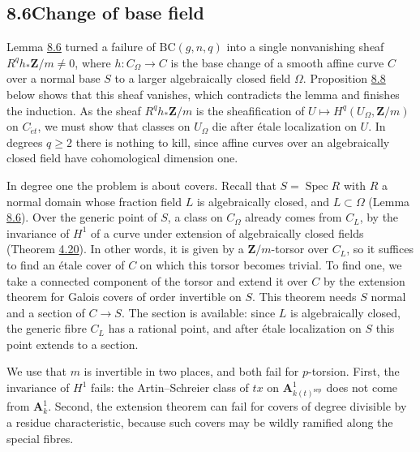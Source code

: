 \documentclass[11pt]{article}
\begin{document}
\subsection*{\texorpdfstring{8.6\quad Change of base field}{8.6 Change of base field}}
\label{bp666}%
\label{bp667}%
Lemma \hyperref[bp662]{8.6} turned a failure of \(\mathrm{BC}(g,n,q)\) into a single nonvanishing sheaf \(R^qh_*\mathbf Z/m\ne0\), where \(h:C_\Omega\to C\) is the base change of a smooth affine curve \(C\) over a normal base \(S\) to a larger algebraically closed field \(\Omega\). Proposition \hyperref[bp668]{8.8} below shows that this sheaf vanishes, which contradicts the lemma and finishes the induction. As the sheaf \(R^qh_*\mathbf Z/m\) is the sheafification of \(U\mapsto H^q(U_\Omega,\mathbf Z/m)\) on \(C_{\acute{e}t}\), we must show that classes on \(U_\Omega\) die after étale localization on \(U\). In degrees \(q\geq2\) there is nothing to kill, since affine curves over an algebraically closed field have cohomological dimension one.

In degree one the problem is about covers. Recall that \(S=\operatorname{Spec}R\) with \(R\) a normal domain whose fraction field \(L\) is algebraically closed, and \(L\subset\Omega\) (Lemma \hyperref[bp662]{8.6}). Over the generic point of \(S\), a class on \(C_\Omega\) already comes from \(C_L\), by the invariance of \(H^1\) of a curve under extension of algebraically closed fields (Theorem \hyperref[bp340]{4.20}). In other words, it is given by a \(\mathbf Z/m\)-torsor over \(C_L\), so it suffices to find an étale cover of \(C\) on which this torsor becomes trivial. To find one, we take a connected component of the torsor and extend it over \(C\) by the extension theorem for Galois covers of order invertible on \(S\). This theorem needs \(S\) normal and a section of \(C\to S\). The section is available: since \(L\) is algebraically closed, the generic fibre \(C_L\) has a rational point, and after étale localization on \(S\) this point extends to a section.

We use that \(m\) is invertible in two places, and both fail for \(p\)-torsion. First, the invariance of \(H^1\) fails: the Artin–Schreier class of \(tx\) on \(\mathbf A^1_{k(t)^{\mathrm{sep}}}\) does not come from \(\mathbf A^1_k\). Second, the extension theorem can fail for covers of degree divisible by a residue characteristic, because such covers may be wildly ramified along the special fibres.
\end{document}

